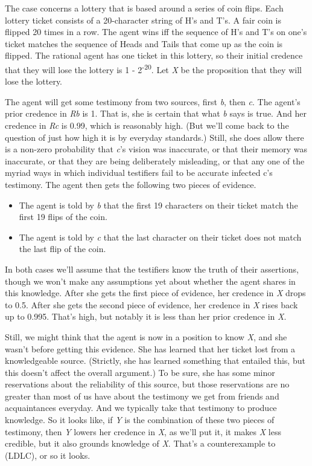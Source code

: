 \documentclass[
  10pt,
  letterpaper,
  DIV=11,
  numbers=noendperiod,
  twoside]{scrartcl}
\providecommand{\tightlist}{%
  \setlength{\itemsep}{0pt}\setlength{\parskip}{0pt}}\usepackage{longtable,booktabs,array}
\begin{document}
The case concerns a lottery that is based around a series of coin flips.
Each lottery ticket consists of a 20-character string of H's and T's. A
fair coin is flipped 20 times in a row. The agent wins iff the sequence
of H's and T's on one's ticket matches the sequence of Heads and Tails
that come up as the coin is flipped. The rational agent has one ticket
in this lottery, so their initial credence that they will lose the
lottery is 1 - 2\textsuperscript{-20}. Let \emph{X} be the proposition
that they will lose the lottery.

The agent will get some testimony from two sources, first \emph{b}, then
\emph{c}. The agent's prior credence in \emph{Rb} is 1. That is, she is
certain that what \emph{b} says is true. And her credence in \emph{Rc}
is 0.99, which is reasonably high. (But we'll come back to the question
of just how high it is by everyday standards.) Still, she does allow
there is a non-zero probability that \emph{c}'s vision was inaccurate,
or that their memory was inaccurate, or that they are being deliberately
misleading, or that any one of the myriad ways in which individual
testifiers fail to be accurate infected c's testimony. The agent then
gets the following two pieces of evidence.

\begin{itemize}
\tightlist
\item
  The agent is told by \emph{b} that the first 19 characters on their
  ticket match the first 19 flips of the coin.
\item
  The agent is told by \emph{c} that the last character on their ticket
  does not match the last flip of the coin.
\end{itemize}

In both cases we'll assume that the testifiers know the truth of their
assertions, though we won't make any assumptions yet about whether the
agent shares in this knowledge. After she gets the first piece of
evidence, her credence in \emph{X} drops to 0.5. After she gets the
second piece of evidence, her credence in \emph{X} rises back up to
0.995. That's high, but notably it is less than her prior credence in
\emph{X}.

Still, we might think that the agent is now in a position to know
\emph{X}, and she wasn't before getting this evidence. She has learned
that her ticket lost from a knowledgeable source. (Strictly, she has
learned something that entailed this, but this doesn't affect the
overall argument.) To be sure, she has some minor reservations about the
reliability of this source, but those reservations are no greater than
most of us have about the testimony we get from friends and
acquaintances everyday. And we typically take that testimony to produce
knowledge. So it looks like, if \emph{Y} is the combination of these two
pieces of testimony, then \emph{Y} lowers her credence in \emph{X}, as
we'll put it, it makes \emph{X} less credible, but it also grounds
knowledge of \emph{X}. That's a counterexample to (LDLC), or so it
looks.
\end{document}
